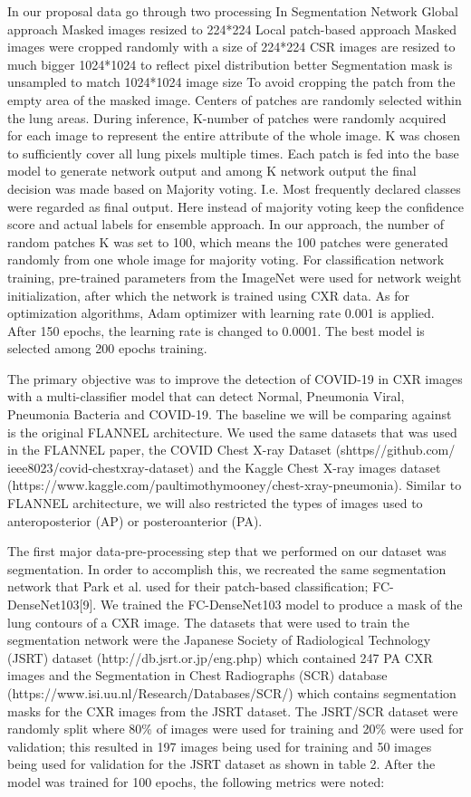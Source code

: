 \documentclass{sigkddExp}
\begin{document}
In our proposal data go through two processing
In Segmentation Network
Global approach
Masked images resized to 224*224
Local patch-based approach
Masked images were cropped randomly with a size of 224*224
CSR images are resized to much bigger 1024*1024 to reflect pixel distribution better
Segmentation mask is unsampled to match 1024*1024 image size
To avoid cropping the patch from the empty area of the masked image. Centers of patches are randomly selected within the lung areas.
During inference, K-number of patches were randomly acquired for each image to represent the entire attribute of the whole image.
K was chosen to sufficiently cover all lung pixels multiple times.
Each patch is fed into the base model to generate network output and among K network output the final decision was made based on Majority voting. I.e. Most frequently declared classes were regarded as final output. Here instead of majority voting keep the confidence score and actual labels for ensemble approach.
In our approach, the number of random patches K was set to 100, which means the 100 patches were generated randomly from one whole image for majority voting.
For classification network training, pre-trained parameters from the ImageNet were used for network weight initialization, after which the network is trained using CXR data. As for optimization algorithms, Adam optimizer with learning rate 0.001 is applied. After 150 epochs, the learning rate is changed to 0.0001. The best model is selected among 200 epochs training.

The primary objective was to improve the detection of COVID-19 in CXR images
with a multi-classifier model that can detect Normal, Pneumonia Viral, Pneumonia
Bacteria and COVID-19. The baseline we will be comparing against is the original
FLANNEL architecture. We used the same datasets that was used in the FLANNEL
paper, the COVID Chest X-ray Dataset (shttps\://github.com/
ieee8023/covid-chestxray-dataset) and the Kaggle Chest X-ray images dataset
(https://www.kaggle.com/paultimothymooney/chest-xray-pneumonia). Similar to
FLANNEL architecture, we will also restricted the types of images used to
anteroposterior (AP) or posteroanterior (PA).

The first major data-pre-processing step that we performed on our dataset was
segmentation. In order to accomplish this, we recreated the same segmentation
network that Park et al. used for their patch-based classification;
FC-DenseNet103[9]. We trained the FC-DenseNet103 model to produce a mask of the
lung contours of a CXR image. The datasets that were used to train the
segmentation network were the Japanese Society of Radiological Technology (JSRT)
dataset (http://db.jsrt.or.jp/eng.php) which contained 247 PA CXR images and the
Segmentation in Chest Radiographs (SCR) database
(https://www.isi.uu.nl/Research/Databases/SCR/)  which contains segmentation
masks for the CXR images from the JSRT dataset. The JSRT/SCR dataset were
randomly split where 80\% of images were used for training and 20\% were used for
validation; this resulted in 197 images being used for training and 50 images
being used for validation for the JSRT dataset as shown in table 2. After the
model was trained for 100 epochs, the following metrics were noted:
\end{document}
